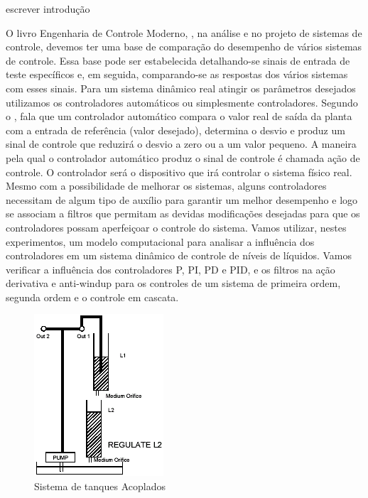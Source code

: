 \documentclass[a4paper,12pt]{article}
\begin{document}
\begin{flushleft}
\hspace{4ex}
escrever introdução \cite{roteiro2021}

\begin{flushleft}
\hspace{4ex}O livro Engenharia de Controle Moderno, \cite{kathushiko2011engenharia}, na análise e no projeto de sistemas de controle, devemos ter uma base de comparação do desempenho de vários sistemas de controle. Essa base pode ser estabelecida detalhando-se sinais de entrada de teste específicos e, em seguida, comparando-se as respostas dos vários sistemas com esses sinais. Para um sistema dinâmico real atingir os parâmetros desejados utilizamos os controladores automáticos ou simplesmente controladores. Segundo o \cite{kathushiko2011engenharia}, fala que um controlador automático compara o valor real de saída da planta com a entrada de referência (valor desejado), determina o desvio e produz um sinal de controle que reduzirá o desvio a zero ou a um valor pequeno. A maneira pela qual o controlador automático produz o sinal de controle é chamada ação de controle. O controlador será o dispositivo que irá controlar o sistema físico real. Mesmo com a possibilidade de melhorar os sistemas, alguns controladores necessitam de algum tipo de auxílio para garantir um melhor desempenho e logo se associam a filtros que permitam as devidas modificações desejadas para que os controladores possam aperfeiçoar o controle do sistema.  Vamos utilizar, nestes experimentos, um modelo computacional para analisar a influência dos controladores em um sistema dinâmico de controle de níveis de líquidos. Vamos verificar a influência dos controladores P, PI, PD e PID, e os filtros na ação derivativa e anti-windup para os controles de um sistema de primeira ordem, segunda ordem e o controle em cascata.
\end{flushleft}


\begin{figure}[h]
    \centering
    \includegraphics{images/1_relatorio/config_2.png}
    \caption{Sistema de tanques Acoplados}
    \label{fig:sistema_de_tanques_acoplados}
\end{figure}

\newpage
 \cite{scilab2010}   
 
 

\end{flushleft}
\end{document}
